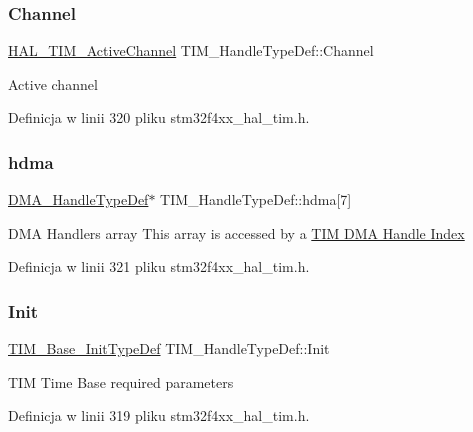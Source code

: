 \subsubsection{\texorpdfstring{Channel}{Channel}}
{\footnotesize\ttfamily \hyperlink{group___t_i_m___exported___types_gaa3fa7bcbb4707f1151ccfc90a8cf9706}{H\+A\+L\+\_\+\+T\+I\+M\+\_\+\+Active\+Channel} T\+I\+M\+\_\+\+Handle\+Type\+Def\+::\+Channel}

Active channel 

Definicja w linii 320 pliku stm32f4xx\+\_\+hal\+\_\+tim.\+h.

\mbox{\label{struct_t_i_m___handle_type_def_a15338c71de82fa178c685be868e694bd}} 
\subsubsection{\texorpdfstring{hdma}{hdma}}
{\footnotesize\ttfamily \hyperlink{group___d_m_a___exported___types_ga41b754a906b86bce54dc79938970138b}{D\+M\+A\+\_\+\+Handle\+Type\+Def}$\ast$ T\+I\+M\+\_\+\+Handle\+Type\+Def\+::hdma\mbox{[}7\mbox{]}}

D\+MA Handlers array This array is accessed by a \hyperlink{group___d_m_a___handle__index}{T\+IM D\+MA Handle Index} 

Definicja w linii 321 pliku stm32f4xx\+\_\+hal\+\_\+tim.\+h.

\mbox{\label{struct_t_i_m___handle_type_def_a8b2e61c3c4128e62cb7be7d35048152e}} 
\subsubsection{\texorpdfstring{Init}{Init}}
{\footnotesize\ttfamily \hyperlink{struct_t_i_m___base___init_type_def}{T\+I\+M\+\_\+\+Base\+\_\+\+Init\+Type\+Def} T\+I\+M\+\_\+\+Handle\+Type\+Def\+::\+Init}

T\+IM Time Base required parameters 

Definicja w linii 319 pliku stm32f4xx\+\_\+hal\+\_\+tim.\+h.

\mbox{\label{struct_t_i_m___handle_type_def_ad0c5f736a15f6d8d14724854c8133bcc}} 
